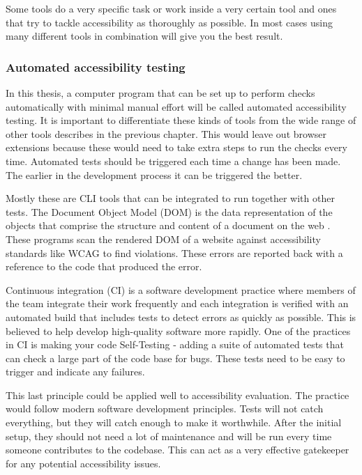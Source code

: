 \documentclass{master_thesis}
\begin{document}
Some tools do a very specific task or work inside a very certain tool and ones that try to tackle accessibility as thoroughly as possible. In most cases using many different tools in combination will give you the best result.

\subsubsection{Automated accessibility testing}

In this thesis, a computer program that can be set up to perform checks automatically with minimal manual effort will be called automated accessibility testing. It is important to differentiate these kinds of tools from the wide range of other tools describes in the previous chapter. This would leave out browser extensions because these would need to take extra steps to run the checks every time. Automated tests should be triggered each time a change has been made. The earlier in the development process it can be triggered the better.

Mostly these are CLI tools that can be integrated to run together with other tests. The Document Object Model (DOM) is the data representation of the objects that comprise the structure and content of a document on the web \citep{MDN2023}. These programs scan the rendered DOM of a website against accessibility standards like WCAG to find violations. These errors are reported back with a reference to the code that produced the error.

Continuous integration (CI) is a software development practice where members of the team integrate their work frequently and each integration is verified with an automated build that includes tests to detect errors as quickly as possible. This is believed to help develop high-quality software more rapidly. One of the practices in CI is making your code Self-Testing - adding a suite of automated tests that can check a large part of the code base for bugs. These tests need to be easy to trigger and indicate any failures.
\citep{Fowler2006}

This last principle could be applied well to accessibility evaluation. The practice would follow modern software development principles. Tests will not catch everything, but they will catch enough to make it worthwhile. After the initial setup, they should not need a lot of maintenance and will be run every time someone contributes to the codebase. This can act as a very effective gatekeeper for any potential accessibility issues.
\end{document}
